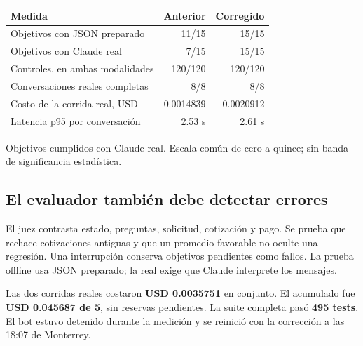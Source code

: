 \documentclass[11pt,a4paper]{article}
\begin{document}
\begin{tabularx}{\linewidth}{@{}Yrr@{}}
\toprule
\textbf{Medida} & \textbf{Anterior} & \textbf{Corregido}\\
\midrule
Objetivos con JSON preparado & 11/15 & 15/15\\
Objetivos con Claude real & 7/15 & 15/15\\
Controles, en ambas modalidades & 120/120 & 120/120\\
Conversaciones reales completas & 8/8 & 8/8\\
Costo de la corrida real, USD & 0.0014839 & 0.0020912\\
Latencia p95 por conversación & 2.53 s & 2.61 s\\
\bottomrule
\end{tabularx}

\begin{center}
\end{center}
{\small\textcolor{muted}{Objetivos cumplidos con Claude real. Escala común de cero a quince; sin banda de significancia estadística.}}

\subsection{El evaluador también debe detectar errores}
El juez contrasta estado, preguntas, solicitud, cotización y pago. Se prueba que
rechace cotizaciones antiguas y que un promedio favorable no oculte una regresión.
Una interrupción conserva objetivos pendientes como fallos. La prueba offline usa
JSON preparado; la real exige que Claude interprete los mensajes.

Las dos corridas reales costaron \textbf{USD 0.0035751} en conjunto. El acumulado
fue \textbf{USD 0.045687 de 5}, sin reservas pendientes. La suite completa pasó
\textbf{495 tests}. El bot estuvo detenido durante la medición y se reinició con
la corrección a las 18:07 de Monterrey.
\end{document}
